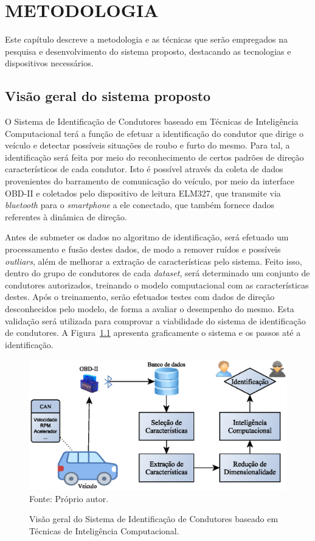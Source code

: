 \chapter{METODOLOGIA}
\label{cap:metodologia}

Este capítulo descreve a metodologia e as técnicas que serão empregados na pesquisa e desenvolvimento do sistema proposto, destacando as tecnologias e dispositivos necessários.

\section{Visão geral do sistema proposto}

O Sistema de Identificação de Condutores baseado em Técnicas de Inteligência Computacional terá a função de efetuar a identificação do condutor que dirige o veículo e detectar possíveis situações de roubo e furto do mesmo. Para tal, a identificação será feita por meio do reconhecimento de certos padrões de direção característicos de cada condutor. Isto é possível através da coleta de dados provenientes do barramento de comunicação do veículo, por meio da interface OBD-II e coletados pelo dispositivo de leitura ELM327, que transmite via \textit{bluetooth} para o \textit{smartphone} a ele conectado, que também fornece dados referentes à dinâmica de direção.

Antes de submeter os dados no algoritmo de identificação, será efetuado um processamento e fusão destes dados, de modo a remover ruídos e possíveis \textit{outliars}, além de melhorar a extração de características pelo sistema. Feito isso, dentro do grupo de condutores de cada \textit{dataset}, será determinado um conjunto de condutores autorizados, treinando o modelo computacional com as características destes. Após o treinamento, serão efetuados testes com dados de direção desconhecidos pelo modelo, de forma a avaliar o desempenho do mesmo. Esta validação será utilizada para comprovar a viabilidade do sistema de identificação de condutores. A Figura~\ref{fig:flux} apresenta graficamente o sistema e os passos até a identificação.

\begin{figure}[!htb]
\centering
\caption{Visão geral do Sistema de Identificação de Condutores baseado em Técnicas de Inteligência Computacional.} %
\includegraphics[width=0.7\linewidth]{FLUXOGRAMA.eps}\\ 
{\small Fonte: Próprio autor.} %
\label{fig:flux} %
\end{figure}

